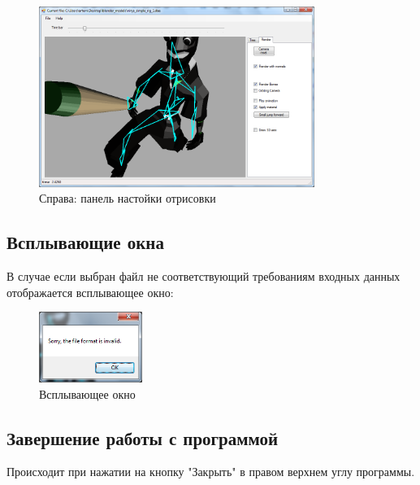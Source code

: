 \begin{figure}[h!]
    \centering
    \includegraphics[width=0.8\textwidth]{../screenshots/interface_map.png}
    \caption{Справа: панель настойки отрисовки}
\end{figure}


\subsection{Всплывающие окна}
В случае если выбран файл не соответствующий требованиям входных данных отображается всплывающее окно:

\begin{figure}[h!]
    \centering
    \includegraphics[width=0.3\textwidth]{../screenshots/error_message.png}
    \caption{Всплывающее окно}
\end{figure}


\subsection{Завершение работы с программой}
Происходит при нажатии на кнопку "Закрыть" в правом верхнем углу программы.
